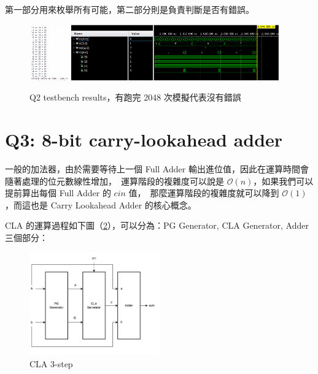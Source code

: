 \documentclass[10.5pt,compsoc,UTF8]{CjC}
\theoremstyle{mystyle}
\begin{document}
第一部分用來枚舉所有可能，第二部分則是負責判斷是否有錯誤。

\begin{figure}[!ht]
  \centering
  \includegraphics[width=0.15\textwidth]{Q2-display.png}
  \includegraphics[width=0.8\textwidth]{Q2-wave.png}
  \caption{Q2 testbench results，有跑完 2048 次模擬代表沒有錯誤}
  \label{fig:Q2_display}
\end{figure}

\newpage

\section{Q3: 8-bit carry-lookahead adder}
\label{sec:Q3}

一般的加法器，由於需要等待上一個 Full Adder 輸出進位值，因此在運算時間會隨著處理的位元數線性增加，\
運算階段的複雜度可以說是 $\mathcal{O}(n)$，如果我們可以提前算出每個 Full Adder 的 $cin$ 值，\
那麼運算階段的複雜度就可以降到 $\mathcal{O}(1)$，而這也是 Carry Lookahead Adder 的核心概念。

CLA 的運算過程如下圖（\ref{fig:CLA-3step}），可以分為：PG Generator, CLA Generator, Adder 三個部分：

\begin{figure}[htp]
  \centering
  \includegraphics[width=0.5\textwidth]{CLA-3step.png}
  \caption{CLA 3-step}
  \label{fig:CLA-3step}
\end{figure}
\end{document}

